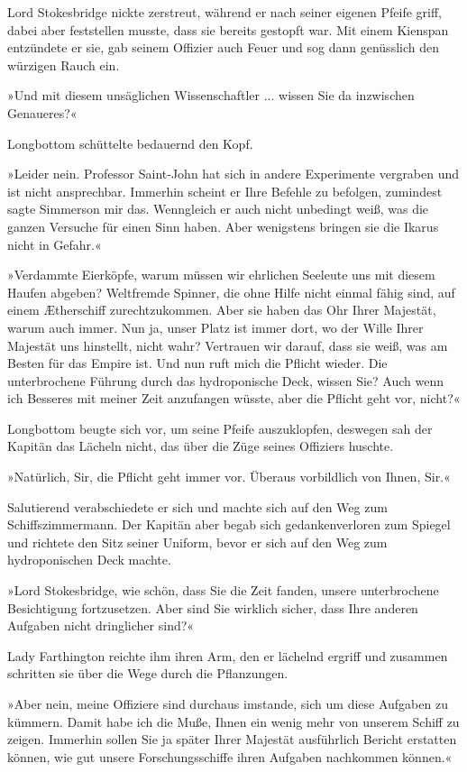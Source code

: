 Lord Stokesbridge nickte zerstreut, während er nach seiner eigenen
Pfeife griff, dabei aber feststellen musste, dass sie bereits
gestopft war. Mit einem Kienspan entzündete er sie, gab seinem
Offizier auch Feuer und sog dann genüsslich den würzigen Rauch
ein.

»Und mit diesem unsäglichen Wissenschaftler ... wissen Sie da
inzwischen Genaueres?«

Longbottom schüttelte bedauernd den Kopf.

»Leider nein. Professor Saint-John hat sich in andere Experimente
vergraben und ist nicht ansprechbar. Immerhin scheint er Ihre
Befehle zu befolgen, zumindest sagte Simmerson mir das. Wenngleich
er auch nicht unbedingt weiß, was die ganzen Versuche für einen
Sinn haben. Aber wenigstens bringen sie die Ikarus nicht in
Gefahr.«

»Verdammte Eierköpfe, warum müssen wir ehrlichen Seeleute uns mit
diesem Haufen abgeben? Weltfremde Spinner, die ohne Hilfe nicht
einmal fähig sind, auf einem Ætherschiff zurechtzukommen. Aber sie
haben das Ohr Ihrer Majestät, warum auch immer. Nun ja, unser Platz
ist immer dort, wo der Wille Ihrer Majestät uns hinstellt, nicht
wahr? Vertrauen wir darauf, dass sie weiß, was am Besten für das
Empire ist. Und nun ruft mich die Pflicht wieder. Die unterbrochene
Führung durch das hydroponische Deck, wissen Sie? Auch wenn ich
Besseres mit meiner Zeit anzufangen wüsste, aber die Pflicht geht
vor, nicht?«

Longbottom beugte sich vor, um seine Pfeife auszuklopfen, deswegen
sah der Kapitän das Lächeln nicht, das über die Züge seines
Offiziers huschte.

»Natürlich, Sir, die Pflicht geht immer vor. Überaus vorbildlich
von Ihnen, Sir.«

Salutierend verabschiedete er sich und machte sich auf den Weg zum
Schiffszimmermann. Der Kapitän aber begab sich gedankenverloren zum
Spiegel und richtete den Sitz seiner Uniform, bevor er sich auf den
Weg zum hydroponischen Deck machte.

\bigpar

»Lord Stokesbridge, wie schön, dass Sie die Zeit fanden, unsere
unterbrochene Besichtigung fortzusetzen. Aber sind Sie wirklich
sicher, dass Ihre anderen Aufgaben nicht dringlicher sind?«

Lady Farthington reichte ihm ihren Arm, den er lächelnd ergriff und
zusammen schritten sie über die Wege durch die Pflanzungen.

»Aber nein, meine Offiziere sind durchaus imstande, sich um diese
Aufgaben zu kümmern. Damit habe ich die Muße, Ihnen ein wenig mehr
von unserem Schiff zu zeigen. Immerhin sollen Sie ja später Ihrer
Majestät ausführlich Bericht erstatten können, wie gut unsere
Forschungsschiffe ihren Aufgaben nachkommen können.«

